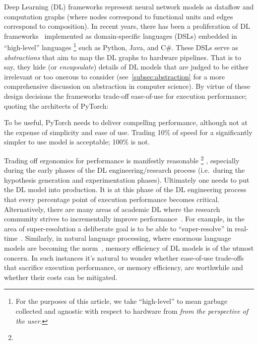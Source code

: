Deep Learning (DL) frameworks represent neural network models as dataflow and computation graphs (where nodes correspond to functional units and edges correspond to composition).
In recent years, there has been a proliferation of DL frameworks~\cite{paszke2019pytorch,abadi2016tensorflow,chen2015mxnet,cntk} implemented as domain-specific languages (DSLs) embedded in ``high-level'' languages%
\footnote{For the purposes of this article, we take ``high-level'' to mean garbage collected and agnostic with respect to hardware from \textit{from the perspective of the user}.} such as Python, Java, and C\#.
These DSLs serve as \textit{abstractions} that aim to map the DL graphs to hardware pipelines.
That is to say, they hide (or \textit{encapsulate}) details of DL models that are judged to be either irrelevant or too onerous to consider (see~\cref{subsec:abstraction} for a more comprehensive discussion on abstraction in computer science).
By virtue of these design decisions the frameworks trade-off ease-of-use for execution performance;
quoting the architects of PyTorch:
\begin{displayquote}
  To be useful, PyTorch needs to deliver compelling performance, although not at the expense of simplicity and ease of use.
  Trading 10\% of speed for a significantly simpler to use model is acceptable; 100\% is not.
\end{displayquote}

Trading off ergonomics for performance is manifestly reasonable%
\footnote{}%
, especially during the early phases of the DL engineering/research process (i.e.\ during the hypothesis generation and experimentation phases).
Ultimately one needs to put the DL model into production.
It is at this phase of the DL engineering process that every percentage point of execution performance becomes critical.
Alternatively, there are many areas of academic DL where the research community strives to incrementally improve performance~\cite{abdelhamed2020ntire,hall2020probability,ILSVRC15}.
For example, in the area of super-resolution a deliberate goal is to be able to ``super-resolve'' in real-time~\cite{7780576}.
Similarly, in natural language processing, where enormous language models are becoming the norm~\cite{brown2020language}, memory efficiency of DL models is of the utmost concern.
In such instances it's natural to wonder whether ease-of-use trade-offs that sacrifice execution performance, or memory efficiency, are worthwhile and whether their costs can be mitigated.

